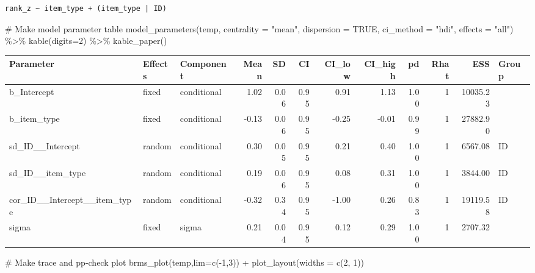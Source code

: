 \documentclass[
  letterpaper,
  DIV=11,
  numbers=noendperiod]{scrartcl}
\newenvironment{Shaded}{\begin{snugshade}}{\end{snugshade}}
\newcommand{\AttributeTok}[1]{\textcolor[rgb]{0.40,0.45,0.13}{#1}}
\newcommand{\CommentTok}[1]{\textcolor[rgb]{0.37,0.37,0.37}{#1}}
\newcommand{\ConstantTok}[1]{\textcolor[rgb]{0.56,0.35,0.01}{#1}}
\newcommand{\DecValTok}[1]{\textcolor[rgb]{0.68,0.00,0.00}{#1}}
\newcommand{\FunctionTok}[1]{\textcolor[rgb]{0.28,0.35,0.67}{#1}}
\newcommand{\NormalTok}[1]{\textcolor[rgb]{0.00,0.23,0.31}{#1}}
\newcommand{\SpecialCharTok}[1]{\textcolor[rgb]{0.37,0.37,0.37}{#1}}
\newcommand{\StringTok}[1]{\textcolor[rgb]{0.13,0.47,0.30}{#1}}
\begin{document}
\begin{verbatim}
rank_z ~ item_type + (item_type | ID) 
\end{verbatim}

\begin{Shaded}
\begin{Highlighting}[]
\CommentTok{\# Make model parameter table}
\FunctionTok{model\_parameters}\NormalTok{(temp, }\AttributeTok{centrality =} \StringTok{"mean"}\NormalTok{, }\AttributeTok{dispersion =} \ConstantTok{TRUE}\NormalTok{, }
                 \AttributeTok{ci\_method =} \StringTok{"hdi"}\NormalTok{, }\AttributeTok{effects =} \StringTok{"all"}\NormalTok{) }\SpecialCharTok{\%\textgreater{}\%} 
  \FunctionTok{kable}\NormalTok{(}\AttributeTok{digits=}\DecValTok{2}\NormalTok{) }\SpecialCharTok{\%\textgreater{}\%} \FunctionTok{kable\_paper}\NormalTok{()}
\end{Highlighting}
\end{Shaded}

\begin{longtable*}[t]{lllrrrrrrrrl}
\toprule
Parameter & Effects & Component & Mean & SD & CI & CI\_low & CI\_high & pd & Rhat & ESS & Group\\
\midrule
b\_Intercept & fixed & conditional & 1.02 & 0.06 & 0.95 & 0.91 & 1.13 & 1.00 & 1 & 10035.23 & \\
b\_item\_type & fixed & conditional & -0.13 & 0.06 & 0.95 & -0.25 & -0.01 & 0.99 & 1 & 27882.90 & \\
sd\_ID\_\_Intercept & random & conditional & 0.30 & 0.05 & 0.95 & 0.21 & 0.40 & 1.00 & 1 & 6567.08 & ID\\
sd\_ID\_\_item\_type & random & conditional & 0.19 & 0.06 & 0.95 & 0.08 & 0.31 & 1.00 & 1 & 3844.00 & ID\\
cor\_ID\_\_Intercept\_\_item\_type & random & conditional & -0.32 & 0.34 & 0.95 & -1.00 & 0.26 & 0.83 & 1 & 19119.58 & ID\\
\addlinespace
sigma & fixed & sigma & 0.21 & 0.04 & 0.95 & 0.12 & 0.29 & 1.00 & 1 & 2707.32 & \\
\bottomrule
\end{longtable*}

\begin{Shaded}
\begin{Highlighting}[]
\CommentTok{\# Make trace and pp{-}check plot}
\FunctionTok{brms\_plot}\NormalTok{(temp,}\AttributeTok{lim=}\FunctionTok{c}\NormalTok{(}\SpecialCharTok{{-}}\DecValTok{1}\NormalTok{,}\DecValTok{3}\NormalTok{))  }\SpecialCharTok{+} \FunctionTok{plot\_layout}\NormalTok{(}\AttributeTok{widths =} \FunctionTok{c}\NormalTok{(}\DecValTok{2}\NormalTok{, }\DecValTok{1}\NormalTok{))}
\end{Highlighting}
\end{Shaded}
\end{document}
